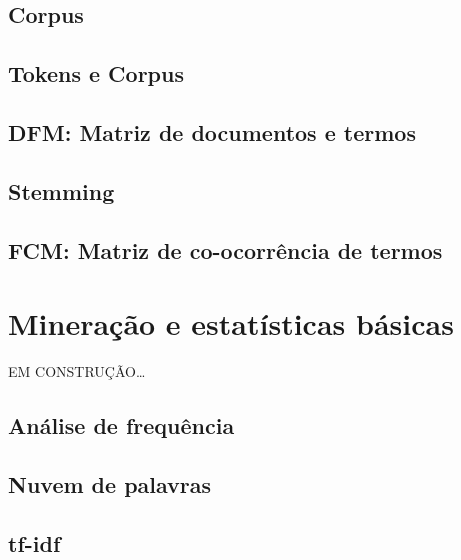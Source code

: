 \documentclass[]{book}
\begin{document}
\hypertarget{corpus}{%
\section{Corpus}\label{corpus}}

\hypertarget{tokens-e-corpus}{%
\section{Tokens e Corpus}\label{tokens-e-corpus}}

\hypertarget{dfm-matriz-de-documentos-e-termos}{%
\section{DFM: Matriz de documentos e termos}\label{dfm-matriz-de-documentos-e-termos}}

\hypertarget{stemming}{%
\section{Stemming}\label{stemming}}

\hypertarget{fcm-matriz-de-co-ocorruxeancia-de-termos}{%
\section{FCM: Matriz de co-ocorrência de termos}\label{fcm-matriz-de-co-ocorruxeancia-de-termos}}

\hypertarget{stat}{%
\chapter{Mineração e estatísticas básicas}\label{stat}}

EM CONSTRUÇÃO\ldots{}

\hypertarget{anuxe1lise-de-frequuxeancia}{%
\section{Análise de frequência}\label{anuxe1lise-de-frequuxeancia}}

\hypertarget{nuvem-de-palavras}{%
\section{Nuvem de palavras}\label{nuvem-de-palavras}}

\hypertarget{tf-idf}{%
\section{tf-idf}\label{tf-idf}}
\end{document}
